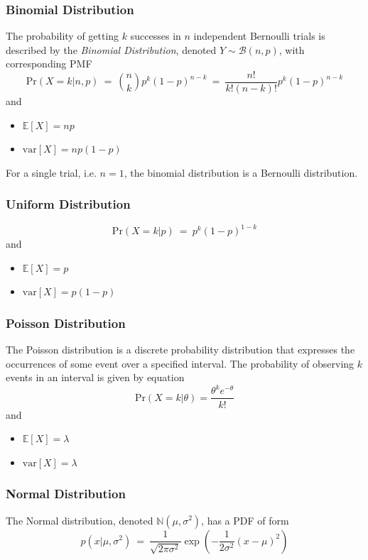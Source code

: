 \documentclass[11pt]{article}
\theoremstyle{plain}
\theoremstyle{definition}
\begin{document}
\subsubsection{Binomial Distribution}
The probability of getting $k$ successes in $n$ independent Bernoulli trials is described by the \textit{Binomial Distribution}, denoted $Y \sim \mathcal{B}(n,p)$, with corresponding PMF
\begin{equation}
\text{Pr}(X=k|n,p) \ = \ \binom{n}{k}p^k(1-p)^{n-k} \ = \ \frac{n!}{k!(n-k)!} p^k(1-p)^{n-k}
\end{equation}
and
\begin{itemize}
	\item $\mathbb{E}[X] = np$
	\item $\text{var}[X] = np(1-p)$
\end{itemize}
For a single trial, i.e. $n=1$, the binomial distribution is a Bernoulli distribution.

\subsubsection{Uniform Distribution}
\begin{equation}
\text{Pr}(X=k|p) \ = \ p^k(1-p)^{1-k}
\end{equation}
and
\begin{itemize}
	\item $\mathbb{E}[X] = p$
	\item $\text{var}[X] = p(1-p)$
\end{itemize}

\subsubsection{Poisson Distribution}
The Poisson distribution is a discrete probability distribution that expresses the occurrences of some event over a specified interval. The probability of observing $k$ events in an interval is given by equation
\begin{equation}
\text{Pr}(X=k|\theta) = \frac{\theta^k e^{-\theta}}{k!}
\end{equation}
and
\begin{itemize}
	\item $\mathbb{E}[X] = \lambda$
	\item $\text{var}[X] = \lambda$
\end{itemize}

\subsubsection{Normal Distribution}
The Normal distribution, denoted $\mathbb{N}(\mu,\sigma^2)$, has a PDF of form
\begin{equation}
p(x|\mu,\sigma^2) \ = \ \frac{1}{\sqrt{2\pi\sigma^2}} \exp{\left(-\frac{1}{2\sigma^2}(x-\mu)^2\right)}
\end{equation}
\end{document}
